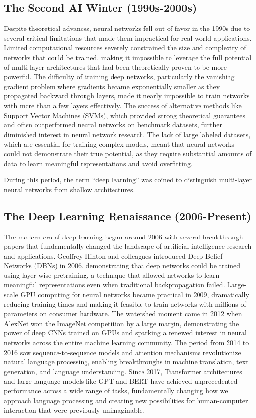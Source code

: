 \subsection{The Second AI Winter (1990s-2000s)}

Despite theoretical advances, neural networks fell out of favor in the 1990s due to several critical limitations that made them impractical for real-world applications. Limited computational resources severely constrained the size and complexity of networks that could be trained, making it impossible to leverage the full potential of multi-layer architectures that had been theoretically proven to be more powerful. The difficulty of training deep networks, particularly the vanishing gradient problem where gradients became exponentially smaller as they propagated backward through layers, made it nearly impossible to train networks with more than a few layers effectively. The success of alternative methods like Support Vector Machines (SVMs), which provided strong theoretical guarantees and often outperformed neural networks on benchmark datasets, further diminished interest in neural network research. The lack of large labeled datasets, which are essential for training complex models, meant that neural networks could not demonstrate their true potential, as they require substantial amounts of data to learn meaningful representations and avoid overfitting.

During this period, the term ``deep learning'' was coined to distinguish multi-layer neural networks from shallow architectures.

\subsection{The Deep Learning Renaissance (2006-Present)}

The modern era of deep learning began around 2006 with several breakthrough papers that fundamentally changed the landscape of artificial intelligence research and applications. Geoffrey Hinton and colleagues introduced Deep Belief Networks (DBNs) in 2006, demonstrating that deep networks could be trained using layer-wise pretraining, a technique that allowed networks to learn meaningful representations even when traditional backpropagation failed. Large-scale GPU computing for neural networks became practical in 2009, dramatically reducing training times and making it feasible to train networks with millions of parameters on consumer hardware. The watershed moment came in 2012 when AlexNet won the ImageNet competition by a large margin, demonstrating the power of deep CNNs trained on GPUs and sparking a renewed interest in neural networks across the entire machine learning community. The period from 2014 to 2016 saw sequence-to-sequence models and attention mechanisms revolutionize natural language processing, enabling breakthroughs in machine translation, text generation, and language understanding. Since 2017, Transformer architectures and large language models like GPT and BERT have achieved unprecedented performance across a wide range of tasks, fundamentally changing how we approach language processing and creating new possibilities for human-computer interaction that were previously unimaginable.

